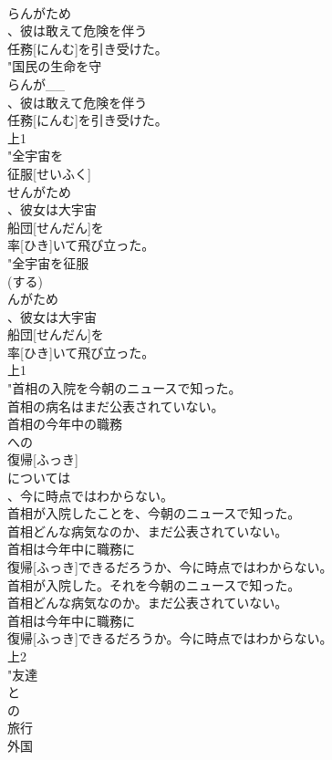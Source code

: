 \documentclass[8pt]{extreport}
\begin{document}
\begin{CJK}{UTF8}{min}
\\	らんがため
\\	、彼は敢えて危険を伴う
\\	任務[にんむ]を引き受けた。
\\	"国民の生命を守
\\	らんが__
\\	、彼は敢えて危険を伴う
\\	任務[にんむ]を引き受けた。
\\	上1
\\	"全宇宙を
\\	征服[せいふく]
\\	せんがため
\\	、彼女は大宇宙
\\	船団[せんだん]を
\\	率[ひき]いて飛び立った。
\\	"全宇宙を征服
\\	(する)
\\	んがため
\\	、彼女は大宇宙
\\	船団[せんだん]を
\\	率[ひき]いて飛び立った。
\\	上1
\\	"首相の入院を今朝のニュースで知った。
\\	首相の病名はまだ公表されていない。
\\	首相の今年中の職務
\\	への
\\	復帰[ふっき]
\\	については
\\	、今に時点ではわからない。
\\	首相が入院したことを、今朝のニュースで知った。
\\	首相どんな病気なのか、まだ公表されていない。
\\	首相は今年中に職務に
\\	復帰[ふっき]できるだろうか、今に時点ではわからない。
\\	首相が入院した。それを今朝のニュースで知った。
\\	首相どんな病気なのか。まだ公表されていない。
\\	首相は今年中に職務に
\\	復帰[ふっき]できるだろうか。今に時点ではわからない。
\\	上2
\\	"友達
\\	と
\\	の
\\	旅行
\\	外国

\end{CJK}
\end{document}

